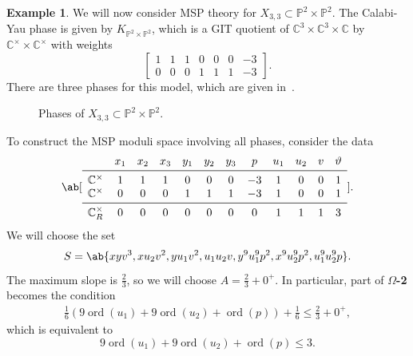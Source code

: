 \documentclass[10pt]{amsart}
\theoremstyle{definition}
\newtheorem{exm}[thm]{Example}
\theoremstyle{remark}
\theoremstyle{plain}
\theoremstyle{definition}
\theoremstyle{remark}
\newcommand{\C}{\mathbb{C}}
\renewcommand{\P}{\mathbb{P}}
\newcommand{\mc}[1]{\mathcal{#1}}
\newcommand{\on}[1]{\operatorname{#1}}
\newcommand{\1}{\mathbf{1}}
\newcommand{\2}{\mathbf{2}}
\newcommand{\3}{\mathbf{3}}
\begin{document}
\begin{exm}
    We will now consider MSP theory for $X_{3,3} \subset \P^2 \times \P^2$. The Calabi-Yau phase is given by $K_{\P^2 \times \P^2}$, which is a GIT quotient of $\C^3 \times \C^3 \times \C$ by $\C^{\times}\times \C^{\times}$ with weights
    \[ \begin{bmatrix}
        1 & 1 & 1 & 0 & 0 & 0 & -3 \\
        0 & 0 & 0 & 1 & 1 & 1 & -3
    \end{bmatrix}. \]
    There are three phases for this model, which are given in~.
    \begin{figure}[htpb]
    \begin{center}
    \end{center}
    \caption{Phases of $X_{3,3} \subset \P^2 \times \P^2$.}%
    \label{fig:p2p2}
    \end{figure}
    To construct the MSP moduli space involving all phases, consider the data 
    \[ \ab[\begin{array}{cccccccccccc}
        & x_1 & x_2 & x_3 & y_1 & y_2 & y_3 & p & u_1 & u_2 & v & \vartheta \\
        \midrule
        \C^{\times} & 1 & 1 & 1 & 0 & 0 & 0 & -3 & 1 & 0 & 0 & 1 \\
        \C^{\times} & 0 & 0 & 0 & 1 & 1 & 1 & -3 & 1 & 0 & 0 & 1 \\
        \midrule
        \C^{\times}_R & 0 & 0 & 0 & 0 & 0 & 0 & 0 & 1 & 1 & 1 & 3
    \end{array}]. \]
    We will choose the set
    \[ S = \ab\{ xyv^3, xu_2 v^2, yu_1 v^2, u_1u_2 v, y^9 u_1^9 p^2, x^9 u_2^9 p^2, u_1^9 u_2^9 p\}. \]
    The maximum slope is $\frac{2}{3}$, so we will choose $A = \frac{2}{3} + 0^+$. In particular, part of \textbf{$\Omega$-2} becomes the condition
    \begin{align*}
        \frac{1}{6} (9 \on{ord}(u_1) + 9 \on{ord}(u_2) + \on{ord}(p)) + \frac{1}{6} \leq \frac{2}{3} + 0^+,
    \end{align*}
    which is equivalent to
    \[ 9 \on{ord}(u_1) + 9 \on{ord}(u_2) + \on{ord}(p) \leq 3. \]

\end{exm}
\end{document}
